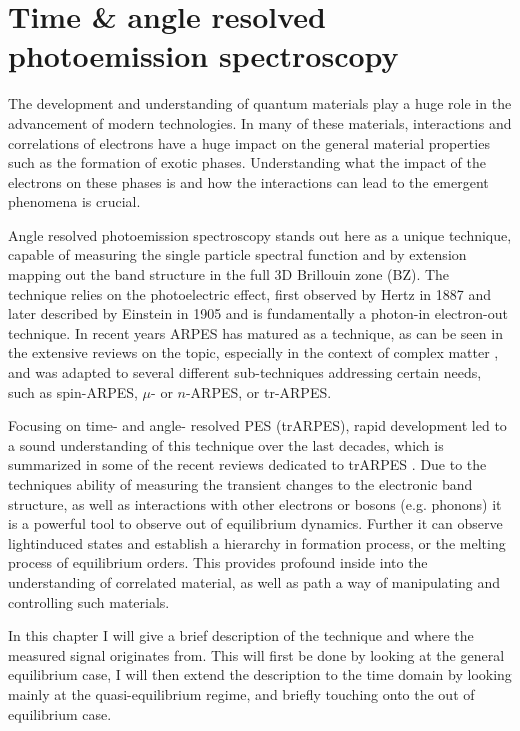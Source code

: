 \chapter{Time \& angle resolved photoemission spectroscopy}

The development and understanding of quantum materials play a huge role in the advancement of modern technologies.
In many of these materials, interactions and correlations of electrons have a huge impact on the general material properties such as the formation of exotic phases.
Understanding what the impact of the electrons on these phases is and how the interactions can lead to the emergent phenomena is crucial.

Angle resolved photoemission spectroscopy stands out here as a unique technique, capable of measuring the single particle spectral function and by extension mapping out the band structure in the full 3D Brillouin zone (BZ).
The technique relies on the photoelectric effect, first observed by Hertz in 1887 and later described by Einstein in 1905 and is fundamentally a photon-in electron-out technique.
In recent years ARPES has matured as a technique, as can be seen in the extensive reviews on the topic, especially in the context of complex matter \cite{}, and was adapted to several different sub-techniques addressing certain needs, such as spin-ARPES, $\mu$- or $n$-ARPES, or tr-ARPES.

Focusing on time- and angle- resolved PES (trARPES), rapid development led to a sound understanding of this technique over the last decades, which is summarized in some of the recent reviews dedicated to trARPES \cite{}.
Due to the techniques ability of measuring the transient changes to the electronic band structure, as well as interactions with other electrons or bosons (e.g. phonons) it is a powerful tool to observe out of equilibrium dynamics.
Further it can observe lightinduced states and establish a hierarchy in formation process, or the melting process of equilibrium orders.
This provides profound inside into the understanding of correlated material, as well as path a way of manipulating and controlling such materials.

In this chapter I will give a brief description of the technique and where the measured signal originates from.
This will first be done by looking at the general equilibrium case, I will then extend the description to the time domain by looking mainly at the quasi-equilibrium regime, and briefly touching onto the out of equilibrium case.

